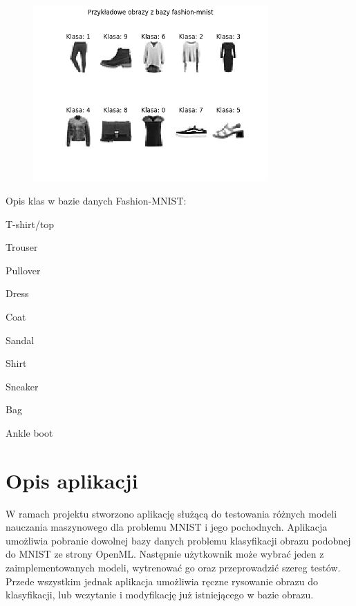 \documentclass{article}
\begin{document}
\begin{figure}[H]
    \centering
    \includegraphics[width=0.8\textwidth]{img/baza_fashion_mnist.png}
\end{figure}

Opis klas w bazie danych Fashion-MNIST:

\begin{enumerate}
    \begin{multicols}{2}
        \centering
        \setcounter{enumi}{-1}
        \item T-shirt/top
        \item Trouser
        \item Pullover
        \item Dress
        \item Coat
        \item Sandal
        \item Shirt
        \item Sneaker
        \item Bag
        \item Ankle boot
    \end{multicols}
\end{enumerate}

\section{Opis aplikacji}
W ramach projektu stworzono aplikację służącą do testowania różnych modeli nauczania maszynowego dla
problemu MNIST i jego pochodnych. Aplikacja umożliwia pobranie 
dowolnej bazy danych problemu klasyfikacji obrazu podobnej
do MNIST ze strony OpenML. Następnie użytkownik może wybrać
jeden z zaimplementowanych modeli, wytrenować go oraz przeprowadzić
szereg testów. Przede wszystkim jednak aplikacja umożliwia 
ręczne rysowanie obrazu do klasyfikacji, lub wczytanie i 
modyfikację już istniejącego w bazie obrazu.
\end{document}
